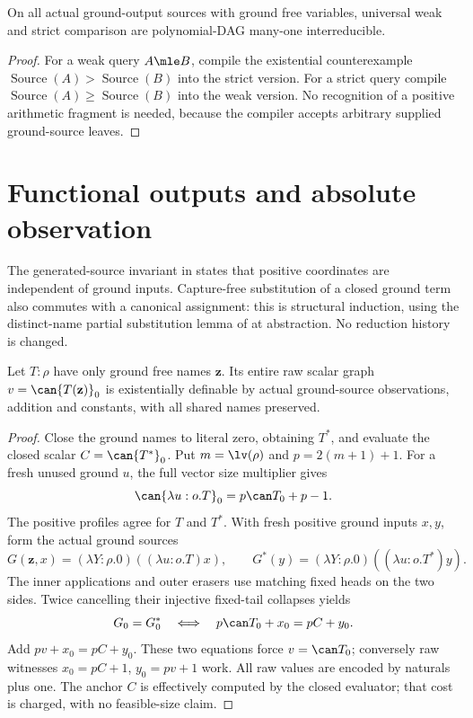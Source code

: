 \documentclass[11pt,a4paper]{article}
\begin{document}
\begin{corollary}\label{cor:ground-equivalence}
On all actual ground-output sources with ground free variables, universal
weak and strict comparison are polynomial-DAG many-one interreducible.
\end{corollary}
\begin{proof}
For a weak query $A\mle B$, compile the existential counterexample
$\operatorname{Source}(A)>\operatorname{Source}(B)$ into the strict version.
For a strict query compile $\operatorname{Source}(A)\ge\operatorname{Source}(B)$
into the weak version.  No recognition of a positive arithmetic fragment is
needed, because the compiler accepts arbitrary supplied ground-source leaves.
\end{proof}

\section{Functional outputs and absolute observation}\label{sec:absolute}

The generated-source invariant in \cite{wwfoundations} states that positive
coordinates are independent of ground inputs.  Capture-free substitution
of a closed ground term also commutes with a canonical assignment: this
is structural induction, using the distinct-name partial substitution
lemma of \cite[Lemma 2.20]{ww} at abstraction.  No reduction history is changed.

\begin{lemma}\label{lem:absolute}
Let $T:\rho$ have only ground free names $\mathbf z$.  Its entire raw scalar
graph $v=\can{T(\mathbf z)}_0$ is existentially definable by actual ground-source
observations, addition and constants, with all shared names preserved.
\end{lemma}
\begin{proof}
Close the ground names to literal zero, obtaining $T^*$, and evaluate the
closed scalar $C=\can{T^*}_0$.  Put $m=\lv(\rho)$ and $p=2(m+1)+1$.
For a fresh unused ground $u$, the full vector size multiplier gives
\[
 \can{\lambda u:o.T}_0=p\can T_0+p-1.
\]
The positive profiles agree for $T$ and $T^*$.  With fresh positive ground
inputs $x,y$, form the actual ground sources
\[
 G(\mathbf z,x)=(\lambda Y:\rho.0)((\lambda u:o.T)x),\qquad
 G^*(y)=(\lambda Y:\rho.0)((\lambda u:o.T^*)y).
\]
The inner applications and outer erasers use matching fixed heads on the two
sides.  Twice cancelling their injective fixed-tail collapses yields
\[
 G_0=G^*_0\quad\Longleftrightarrow\quad
 p\can T_0+x_0=pC+y_0.
\]
Add $pv+x_0=pC+y_0$.  These two equations force $v=\can T_0$;
conversely raw witnesses $x_0=pC+1$, $y_0=pv+1$ work.  All raw values are
encoded by naturals plus one.  The anchor $C$ is effectively computed by the
closed evaluator; that cost is charged, with no feasible-size claim.
\end{proof}
\end{document}
